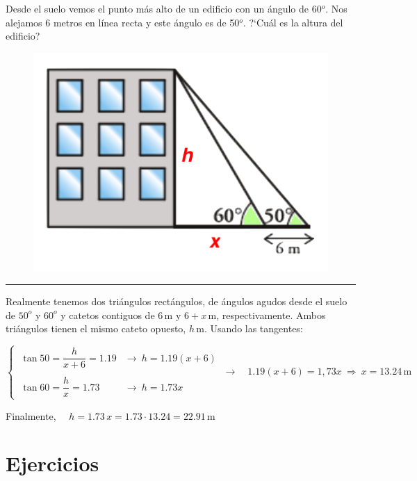 \begin{miejercicio}

\begin{multicols}{2}
\vspace{2mm} Desde el suelo vemos el punto más alto de un edificio con un ángulo de 60$^o$. Nos alejamos 6 metros en línea recta y este ángulo es de 50$^o$. ?`Cuál es la altura del edificio?

\begin{figure}[H]
	\centering
	\includegraphics[width=.3\textwidth]{img-rt/rt33.png}
\end{figure}
\end{multicols}
\vspace{-10mm}
\rule{250pt}{0.1pt}	

\vspace{5mm} Realmente tenemos dos triángulos rectángulos, de ángulos agudos desde el suelo de $50^o$ y $60^o$ y catetos contiguos de $6\, \mathrm{m}$ y $6+x\, \mathrm{m}$, respectivamente. Ambos triángulos tienen el mismo cateto opuesto, $h \, \mathrm{m}$. Usando las tangentes:

\vspace{2mm} $\begin{cases}
 	\ \tan 50 = \dfrac{h}{x+6}=1.19 &\to \ h=1.19(x+6) \\ \\
 	\ \tan 60 = \dfrac h x =1.73 &\to \ h=1.73 x
 \end{cases} \ \to \quad 1.19(x+6)=1,73 x \ \Rightarrow \ x=13.24\, \mathrm{m}$
 
 \vspace{2mm}  Finalmente, $\quad h=1.73 \, x =1.73 \cdot 13.24=22.91 \, \mathrm{m}$

\end{miejercicio}

\vspace{1cm}
\section{Ejercicios}
\vspace{0.5cm}

